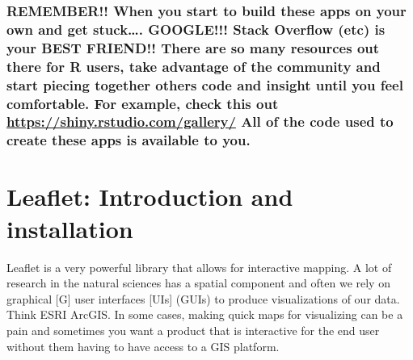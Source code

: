\documentclass[]{article}
\begin{document}
\hypertarget{remember-when-you-start-to-build-these-apps-on-your-own-and-get-stuck.-google-stack-overflow-etc-is-your-best-friend-there-are-so-many-resources-out-there-for-r-users-take-advantage-of-the-community-and-start-piecing-together-others-code-and-insight-until-you-feel-comfortable.-for-example-check-this-out-httpsshiny.rstudio.comgallery-all-of-the-code-used-to-create-these-apps-is-available-to-you.}{%
\subsubsection{\texorpdfstring{REMEMBER!! When you start to build these
apps on your own and get stuck\ldots{}. GOOGLE!!! Stack Overflow (etc)
is your BEST FRIEND!! There are so many resources out there for R users,
take advantage of the community and start piecing together others code
and insight until you feel comfortable. For example, check this out
\url{https://shiny.rstudio.com/gallery/} All of the code used to create
these apps is available to
you.}{REMEMBER!! When you start to build these apps on your own and get stuck\ldots{}. GOOGLE!!! Stack Overflow (etc) is your BEST FRIEND!! There are so many resources out there for R users, take advantage of the community and start piecing together others code and insight until you feel comfortable. For example, check this out https://shiny.rstudio.com/gallery/ All of the code used to create these apps is available to you.}}\label{remember-when-you-start-to-build-these-apps-on-your-own-and-get-stuck.-google-stack-overflow-etc-is-your-best-friend-there-are-so-many-resources-out-there-for-r-users-take-advantage-of-the-community-and-start-piecing-together-others-code-and-insight-until-you-feel-comfortable.-for-example-check-this-out-httpsshiny.rstudio.comgallery-all-of-the-code-used-to-create-these-apps-is-available-to-you.}}

\hypertarget{leaflet-introduction-and-installation}{%
\section{Leaflet: Introduction and
installation}\label{leaflet-introduction-and-installation}}

Leaflet is a very powerful library that allows for interactive mapping.
A lot of research in the natural sciences has a spatial component and
often we rely on graphical {[}G{]} user interfaces {[}UIs{]} (GUIs) to
produce visualizations of our data. Think ESRI ArcGIS. In some cases,
making quick maps for visualizing can be a pain and sometimes you want a
product that is interactive for the end user without them having to have
access to a GIS platform.
\end{document}
